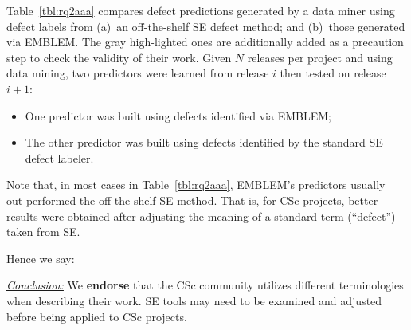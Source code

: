 \documentclass[conference,10pt]{IEEEtran}
\newcommand{\bi}{\begin{itemize}}
\newcommand{\ei}{\end{itemize}}
\newenvironment{RQ}{\vspace{1mm}\begin{tcolorbox}[enhanced,width=3.4in,size=fbox,colback=red!5!white,drop shadow southeast,sharp corners]}{\end{tcolorbox}}
\begin{document}
Table~\ref{tbl:rq2aaa} 
compares defect predictions generated by a data
miner using defect labels from (a)~an off-the-shelf SE defect method;
and (b)~those generated via EMBLEM. The gray high-lighted ones are additionally added as a precaution step to check the validity of their work. 
Given $N$ releases per project and using data mining, two predictors were learned from release $i$ then tested on release $i+1$:
\bi
\item
One predictor was built using defects identified  via EMBLEM;
\item
The other predictor was built using defects identified by the standard SE defect labeler.
\ei


Note that, in most cases in  Table~\ref{tbl:rq2aaa},  EMBLEM's predictors usually out-performed the off-the-shelf SE method. 
That is, for CSc projects,
better results were obtained after adjusting the meaning of a standard term (``defect'')
taken from SE.


Hence we say:

\begin{RQ}
\textit{\underline{Conclusion:}} We \textbf{endorse} that the CSc community utilizes different terminologies when describing their work. SE tools
may need to be examined and adjusted before being applied to CSc projects.
\end{RQ}

\end{document}
